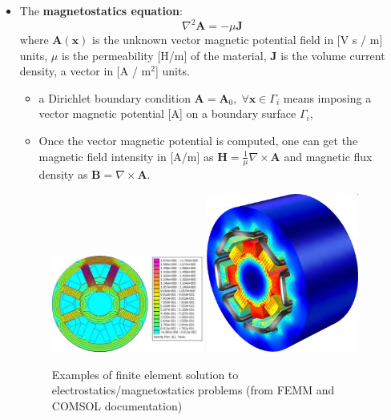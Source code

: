 \documentclass{digitaldynamics}
\def\vect#1{\bm{#1}}
\begin{document}
\begin{itemize}
	\item The \textbf{magnetostatics equation}:
	\[
	\nabla^2 \vect{A} = -\mu \vect{J}
	\]
	where $\vect{A}(\vect{x})$ is the unknown vector magnetic potential field in [V s / m] units, 
	$\mu$ is the permeability [H/m] of the material,
	$\vect{J}$ is the volume current density, a vector in [A / m${}^2$] units. 
	\begin{itemize}
		\item a Dirichlet boundary condition $\vect{A}=\vect{A}_0, \; \forall \vect{x}\in\Gamma_i$ means imposing a vector magnetic potential [A] on a boundary surface $\Gamma_i$, 
		\item Once the vector magnetic potential is computed, one can get the magnetic field intensity in [A/m] as $\vect{H} = \frac{1}{\mu} \nabla \times \vect{A}$ and magnetic flux density as $\vect{B} = \nabla \times \vect{A}$.
	\end{itemize}
	
	
	\begin{figure}
		\centering
			\includegraphics[width=5cm]{pics/es_magnetostatics.jpg}
			\includegraphics[width=5cm]{pics/es_electrostatics.jpg}
		\caption{Examples of finite element solution to electrostatics/magnetostatics problems (from FEMM and COMSOL documentation)}
		\label{fig:es_electrostatics}
	\end{figure}
	

\end{itemize}
\end{document}
